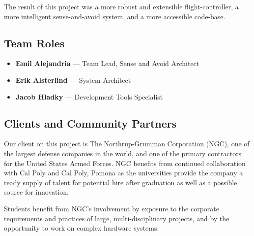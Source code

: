 \documentclass[12pt]{article}
\begin{document}
The result of this project was a more robust and extensible flight-controller, a more intelligent sense-and-avoid system, and a more accessible code-base.

\subsection{Team Roles}

\begin{itemize}
\item \textbf{Emil Alejandria} --- Team Lead, Sense and Avoid Architect
  \item \textbf{Erik Alsterlind} --- System Architect
  \item \textbf{Jacob Hladky}  --- Development Tools Specialist
\end{itemize}

\subsection{Clients and Community Partners}
Our client on this project is The Northrup-Grumman Corporation (NGC), one of the largest defense companies in the world, and one of the primary contractors for the United States Armed Forces. NGC benefits from continued collaboration with Cal Poly and Cal Poly, Pomona as the universities provide the company a ready supply of talent for potential hire after graduation as well as a possible source for innovation.

Students benefit from NGC's involvement by exposure to the corporate requirements and practices of large, multi-disciplinary projects, and by the opportunity to work on complex hardware systems.

\end{document}

